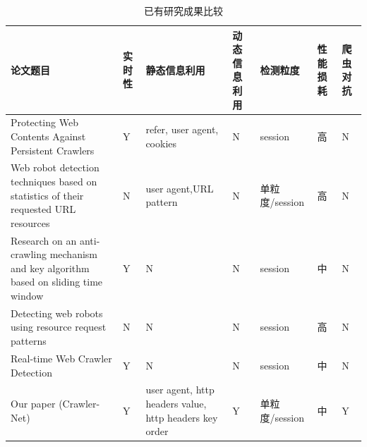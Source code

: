\documentclass[doctor,privacy,twoside]{buaa_mac}
\begin{document}
\centerline{}
\begin{table}[h]
  \caption{已有研究成果比较}
  \label{tab:papercomponents}
  \centering
\begin{tabular}{|p{5cm}<{\centering}|p{1cm}<{\centering}|p{3cm}<{\centering}|p{1cm}<{\centering}|p{2cm}<{\centering}|p{1cm}<{\centering}|p{1cm}<{\centering}|}
    \hline
    论文题目                                                                                  & 实时性 & 静态信息利用                                                 & 动态信息利用 & 检测粒度        & 性能损耗 & 爬虫对抗 \\
    \hline
    Protecting Web Contents Against Persistent Crawlers                                   & Y   & refer, user agent, cookies                             & N      & session     & 高    & N    \\ 
    \hline
    Web robot detection techniques based on statistics of their requested URL resources   & N   & user agent,URL pattern                                 & N      & 单粒度/session & 高    & N    \\
    \hline
    Research on an anti-crawling mechanism and key algorithm based on sliding time window & Y   & N                                                      & N      & session     & 中    & N    \\ 
    \hline
    Detecting web robots using resource request patterns                                  & N   & N                                                      & N      & session     & 高    & N    \\
    \hline
    Real-time Web Crawler Detection                                                       & Y   & N                                                      & N      & session     & 中    & N    \\
    \hline
    Our paper (Crawler-Net)                                                               & Y   & user agent, http headers value, http headers key order & Y      & 单粒度/session & 中    & Y    \\
    \hline
    \end{tabular}
\end{table}
\centerline{}
\end{document}
